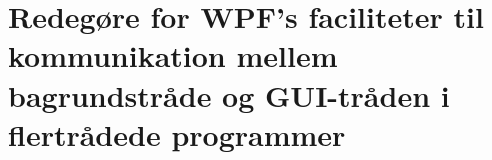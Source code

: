 \section{Redegøre for WPF's faciliteter til kommunikation mellem bagrundstråde og GUI-tråden i flertrådede programmer}\label{sec:spm8}